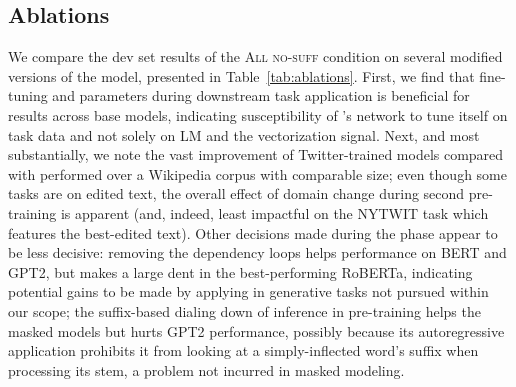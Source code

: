 

\subsection{Ablations}
\label{ssec:abl}
We compare the dev set results of the \textsc{All no-suff} condition on several modified versions of the model, presented in Table~\ref{tab:ablations}.
First, we find that fine-tuning \mmod{} and \tokdetok{} parameters during downstream task application is beneficial for results across base models, indicating susceptibility of \tok{}'s network to tune itself on task data and not solely on LM and the vectorization signal.
Next, and most substantially, we note the vast improvement of Twitter-trained models compared with \ppt{} performed over a Wikipedia corpus with comparable size;
even though some tasks are on edited text, the overall effect of domain change during second pre-training is apparent (and, indeed, least impactful on the NYTWIT task which features the best-edited text).
Other decisions made during the \ppt{} phase appear to be less decisive: removing the dependency loops helps performance on BERT and GPT2, but makes a large dent in the best-performing RoBERTa, indicating potential gains to be made by applying \detok{} in generative tasks not pursued within our scope;
the suffix-based dialing down of inference in pre-training helps the masked models but hurts GPT2 performance, possibly because its autoregressive application prohibits it from looking at a simply-inflected word's suffix when processing its stem, a problem not incurred in masked modeling.



